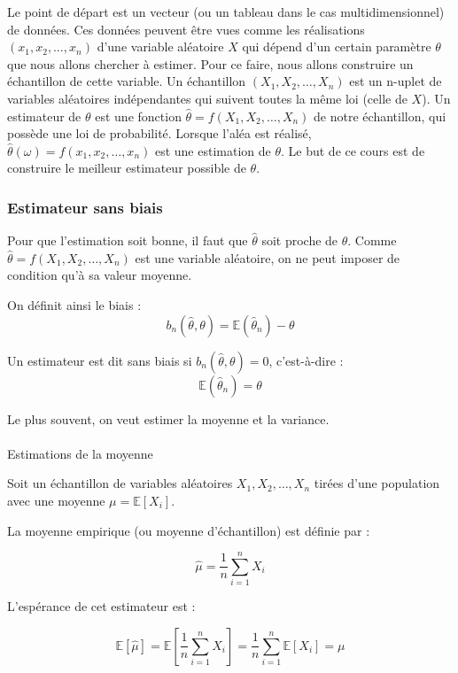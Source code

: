 \documentclass[
  letterpaper,
  DIV=11,
  numbers=noendperiod]{scrartcl}
\makeatletter
\let\oldparagraph\paragraph
\renewcommand{\paragraph}{
    \@ifstar
      \xxxParagraphStar
      \xxxParagraphNoStar
  }
\newcommand{\xxxParagraphStar}[1]{\oldparagraph*{#1}\mbox{}}
\newcommand{\xxxParagraphNoStar}[1]{\oldparagraph{#1}\mbox{}}
\makeatother
\begin{document}
Le point de départ est un vecteur (ou un tableau dans le cas
multidimensionnel) de données. Ces données peuvent être vues comme les
réalisations \((x_1, x_2, \ldots, x_n)\) d'une variable aléatoire \(X\)
qui dépend d'un certain paramètre \(\theta\) que nous allons chercher à
estimer. Pour ce faire, nous allons construire un échantillon de cette
variable. Un échantillon \((X_1, X_2, \ldots, X_n)\) est un n-uplet de
variables aléatoires indépendantes qui suivent toutes la même loi (celle
de \(X\)). Un estimateur de \(\theta\) est une fonction
\(\hat{\theta} = f(X_1, X_2, \ldots, X_n)\) de notre échantillon, qui
possède une loi de probabilité. Lorsque l'aléa est réalisé,
\(\hat{\theta}(\omega) = f(x_1, x_2, \ldots, x_n)\) est une estimation
de \(\theta\). Le but de ce cours est de construire le meilleur
estimateur possible de \(\theta\).

\subsubsection{Estimateur sans biais}\label{estimateur-sans-biais}

Pour que l'estimation soit bonne, il faut que \(\hat{\theta}\) soit
proche de \(\theta\). Comme \(\hat{\theta} = f(X_1, X_2, \ldots, X_n)\)
est une variable aléatoire, on ne peut imposer de condition qu'à sa
valeur moyenne.

On définit ainsi le biais :
\[b_n(\hat{\theta}, \theta) = \mathbb{E}(\hat{\theta}_n) - \theta\]

Un estimateur est dit sans biais si \(b_n(\hat{\theta}, \theta) = 0\),
c'est-à-dire : \[\mathbb{E}(\hat{\theta}_n) = \theta\]

Le plus souvent, on veut estimer la moyenne et la variance.

\paragraph{Estimations de la moyenne}\label{estimations-de-la-moyenne}

Soit un échantillon de variables aléatoires \(X_1, X_2, \dots, X_n\)
tirées d'une population avec une moyenne \(\mu = \mathbb{E}[X_i]\).

La moyenne empirique (ou moyenne d'échantillon) est définie par :

\[
\hat{\mu} = \frac{1}{n} \sum_{i=1}^{n} X_i
\]

L'espérance de cet estimateur est :

\[
\mathbb{E}[\hat{\mu}] = \mathbb{E}\left[\frac{1}{n} \sum_{i=1}^{n} X_i\right] = \frac{1}{n} \sum_{i=1}^{n} \mathbb{E}[X_i] = \mu
\]
\end{document}
